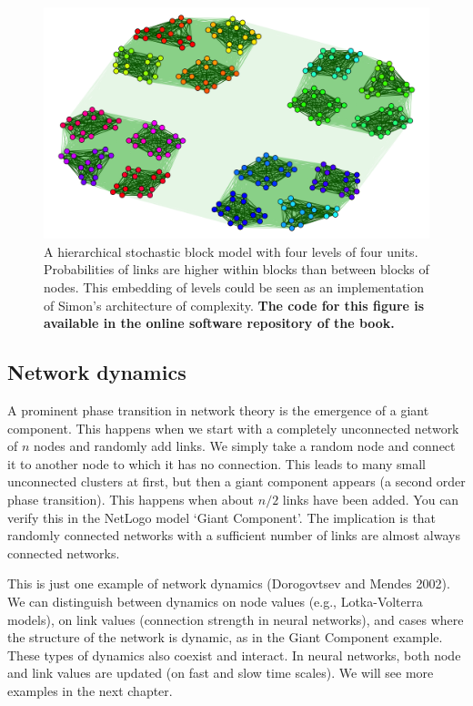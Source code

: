 \documentclass[
  a4paper,
  DIV=11,
  numbers=noendperiod,
  oneside]{scrreprt}
\begin{document}
\begin{figure}

{\centering \includegraphics{media/ch6/fig-ch6-extra.png}

}

\caption{\label{fig-ch6-extra}A hierarchical stochastic block model with
four levels of four units. Probabilities of links are higher within
blocks than between blocks of nodes. This embedding of levels could be
seen as an implementation of Simon's architecture of complexity.
\textbf{The code for this figure is available in the online software
repository of the book.}}

\end{figure}

\hypertarget{sec-Network-dynamics}{%
\subsection{Network dynamics}\label{sec-Network-dynamics}}

A prominent phase transition in network theory is the emergence of a
giant component. This happens when we start with a completely
unconnected network of \(n\) nodes and randomly add links. We simply
take a random node and connect it to another node to which it has no
connection. This leads to many small unconnected clusters at first, but
then a giant component appears (a second order phase transition). This
happens when about \(n/2\) links have been added. You can verify this in
the NetLogo model `Giant Component'. The implication is that randomly
connected networks with a sufficient number of links are almost always
connected networks.

This is just one example of network dynamics (Dorogovtsev and Mendes
2002). We can distinguish between dynamics on node values (e.g.,
Lotka-Volterra models), on link values (connection strength in neural
networks), and cases where the structure of the network is dynamic, as
in the Giant Component example. These types of dynamics also coexist and
interact. In neural networks, both node and link values are updated (on
fast and slow time scales). We will see more examples in the next
chapter.
\end{document}
